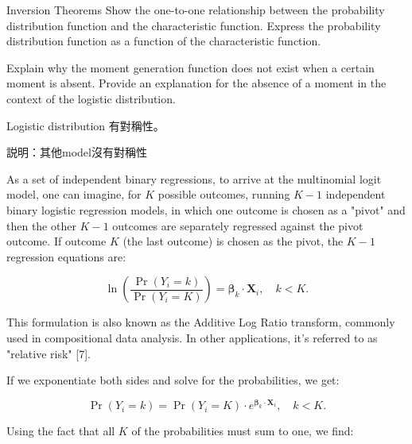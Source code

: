 \documentclass[UTF8,a4paper,10pt]{article}
\begin{document}
\begin{mybox}{}


\end{mybox}





\begin{Problem}[]{Inversion Theorems}
  Show the one-to-one relationship between the probability distribution function and the characteristic function. Express the probability distribution function as a function of the characteristic function.

\end{Problem}


\begin{Problem}[]{}
  Explain why the moment generation function does not exist when a certain moment is absent. Provide an explanation for the absence of a moment in the context of the logistic distribution.
\end{Problem}

\begin{Problem}[]{}
  Logistic distribution 有對稱性。

  説明：其他model沒有對稱性
\end{Problem}

As a set of independent binary regressions, to arrive at the multinomial logit model, one can imagine, for $K$ possible outcomes, running $K-1$ independent binary logistic regression models, in which one outcome is chosen as a "pivot" and then the other $K-1$ outcomes are separately regressed against the pivot outcome. If outcome $K$ (the last outcome) is chosen as the pivot, the $K-1$ regression equations are:

\begin{equation}
\ln\left(\frac{\Pr(Y_i=k)}{\Pr(Y_i=K)}\right) = \boldsymbol{\beta}_k \cdot \mathbf{X}_i, \quad k < K.
\end{equation}

This formulation is also known as the Additive Log Ratio transform, commonly used in compositional data analysis. In other applications, it's referred to as "relative risk" [7].

If we exponentiate both sides and solve for the probabilities, we get:

\begin{equation}
\Pr(Y_i=k) = \Pr(Y_i=K) \cdot e^{\boldsymbol{\beta}_k \cdot \mathbf{X}_i}, \quad k < K.
\end{equation}

Using the fact that all $K$ of the probabilities must sum to one, we find:
\end{document}
